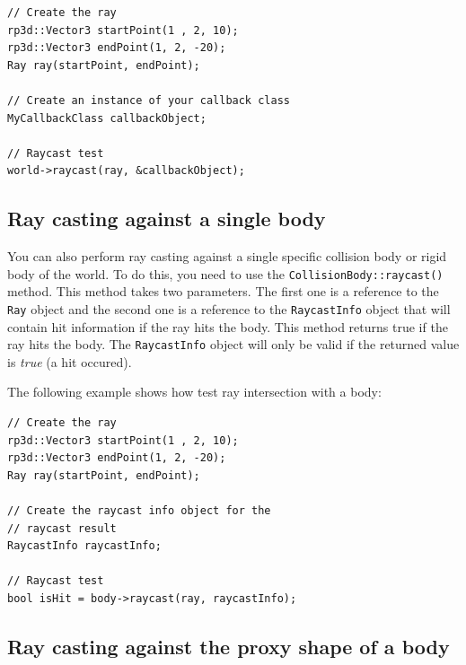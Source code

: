 \documentclass[a4paper,12pt]{article}
\begin{document}
    \begin{lstlisting}
// Create the ray
rp3d::Vector3 startPoint(1 , 2, 10);
rp3d::Vector3 endPoint(1, 2, -20);
Ray ray(startPoint, endPoint);

// Create an instance of your callback class
MyCallbackClass callbackObject;

// Raycast test
world->raycast(ray, &callbackObject);
    \end{lstlisting}

    \vspace{0.6cm}

    \subsection{Ray casting against a single body}

    \begin{sloppypar}

    You can also perform ray casting against a single specific collision body or rigid body of the world. To do this, you need to use the
    \texttt{CollisionBody::raycast()} method. This method takes two parameters. The first one is a reference to the \texttt{Ray} object and the second one
    is a reference to the \texttt{RaycastInfo} object that will contain hit information if the ray hits the body. This method returns true if the ray hits the
    body. The \texttt{RaycastInfo} object will only be valid if the returned value is \emph{true} (a hit occured). \\

    \end{sloppypar}

    The following example shows how test ray intersection with a body: \\

    \begin{lstlisting}
// Create the ray
rp3d::Vector3 startPoint(1 , 2, 10);
rp3d::Vector3 endPoint(1, 2, -20);
Ray ray(startPoint, endPoint);

// Create the raycast info object for the
// raycast result
RaycastInfo raycastInfo;

// Raycast test
bool isHit = body->raycast(ray, raycastInfo);
    \end{lstlisting}

    \vspace{0.6cm}

    \subsection{Ray casting against the proxy shape of a body}
\end{document}
